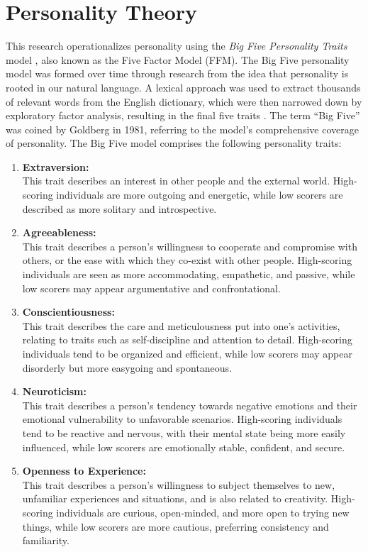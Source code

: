 \section{Personality Theory}

This research operationalizes personality using the \textit{Big Five Personality Traits} model \citep{costa1999five}, also known as the Five Factor Model (FFM). The Big Five personality model was formed over time through research from the idea that personality is rooted in our natural language. A lexical approach was used to extract thousands of relevant words from the English dictionary, which were then narrowed down by exploratory factor analysis, resulting in the final five traits \citep{feher2021looking}. The term “Big Five” was coined by Goldberg in 1981, referring to the model’s comprehensive coverage of personality. The Big Five model comprises the following personality traits:

\begin{enumerate}
	\item \textbf{Extraversion:} \\
	This trait describes an interest in other people and the external world. High-scoring individuals are more outgoing and energetic, while low scorers are described as more solitary and introspective. 
	\item \textbf{Agreeableness:} \\
 	This trait describes a person’s willingness to cooperate and compromise with others, or the ease with which they co-exist with other people. High-scoring individuals are seen as more accommodating, empathetic, and passive, while low scorers may appear argumentative and confrontational. 
	\item \textbf{Conscientiousness:} \\
	This trait describes the care and meticulousness put into one’s activities, relating to traits such as self-discipline and attention to detail. High-scoring individuals tend to be organized and efficient, while low scorers may appear disorderly but more easygoing and spontaneous.
	\item \textbf{Neuroticism:} \\
	This trait describes a person’s tendency towards negative emotions and their emotional vulnerability to unfavorable scenarios. High-scoring individuals tend to be reactive and nervous, with their mental state being more easily influenced, while low scorers are emotionally stable, confident, and secure.
	\item \textbf{Openness to Experience:} \\
	This trait describes a person’s willingness to subject themselves to new, unfamiliar experiences and situations, and is also related to creativity. High-scoring individuals are curious, open-minded, and more open to trying new things, while low scorers are more cautious, preferring consistency and familiarity. 
\end{enumerate}

